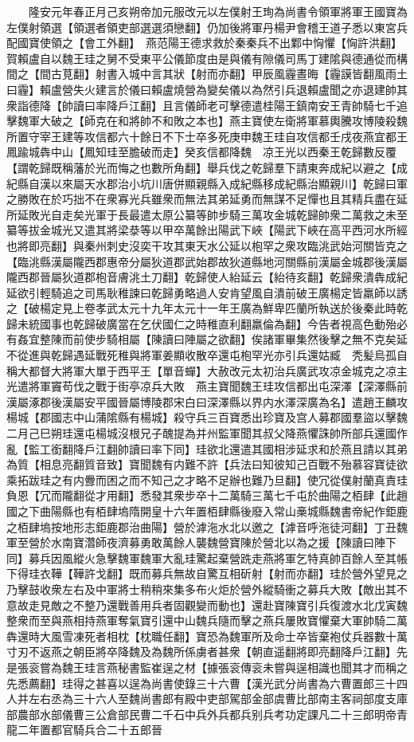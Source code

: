　　隆安元年春正月己亥朔帝加元服改元以左僕射王珣為尚書令領軍將軍王國寶為左僕射領選【領選者領吏部選選須戀翻】仍加後將軍丹楊尹會稽王道子悉以東宮兵配國寶使領之【會工外翻】　燕范陽王德求救於秦秦兵不出鄴中恟懼【恟許洪翻】賀賴盧自以魏王珪之舅不受東平公儀節度由是與儀有隙儀司馬丁建隂與德通從而構間之【間古莧翻】射書入城中言其狀【射而亦翻】甲辰風霾晝晦【霾謨皆翻風雨土曰霾】賴盧營失火建言於儀曰賴盧燒營為變矣儀以為然引兵退賴盧聞之亦退建帥其衆詣德降【帥讀曰率降戶江翻】且言儀師老可擊德遣桂陽王鎮南安王青帥騎七千追擊魏軍大破之【師克在和將帥不和敗之本也】燕主寶使左衛將軍慕輿騰攻博陵殺魏所置守宰王建等攻信都六十餘日不下士卒多死庚申魏王珪自攻信都壬戌夜燕宜都王鳳踰城犇中山【鳳知珪至膽破而走】癸亥信都降魏　凉王光以西秦王乾歸數反覆【謂乾歸既稱藩於光而悔之也數所角翻】舉兵伐之乾歸羣下請東奔成紀以避之【成紀縣自漢以來屬天水郡治小坑川唐併顯親縣入成紀縣移成紀縣治顯親川】乾歸曰軍之勝敗在於巧拙不在衆寡光兵雖衆而無法其弟延勇而無謀不足憚也且其精兵盡在延所延敗光自走矣光軍于長最遣太原公纂等帥步騎三萬攻金城乾歸帥衆二萬救之未至纂等拔金城光又遣其將梁㳟等以甲卒萬餘出陽武下峽【陽武下峽在高平西河水所經也將即亮翻】與秦州刺史沒奕干攻其東天水公延以枹罕之衆攻臨洮武始河關皆克之【臨洮縣漢屬隴西郡惠帝分屬狄道郡武始郡故狄道縣地河關縣前漢屬金城郡後漢屬隴西郡晉屬狄道郡枹音膚洮土刀翻】乾歸使人紿延云【紿待亥翻】乾歸衆潰犇成紀延欲引輕騎追之司馬耿稚諫曰乾歸勇略過人安肯望風自潰前破王廣楊定皆羸師以誘之【破楊定見上卷孝武太元十九年太元十一年王廣為鮮卑匹蘭所執送於後秦此時乾歸未統國事也乾歸破廣當在乞伏國仁之時稚直利翻羸倫為翻】今告者視高色動殆必有姦宜整陳而前使步騎相屬【陳讀曰陣屬之欲翻】俟諸軍畢集然後擊之無不克矣延不從進與乾歸遇延戰死稚與將軍姜顯收散卒還屯枹罕光亦引兵還姑臧　秃髪烏孤自稱大都督大將軍大單于西平王【單音蟬】大赦改元太初治兵廣武攻凉金城克之凉主光遣將軍竇苟伐之戰于街亭凉兵大敗　燕主寶聞魏王珪攻信都出屯深澤【深澤縣前漢屬涿郡後漢屬安平國晉屬博陵郡宋白曰深澤縣以界内水澤深廣為名】遣趙王麟攻楊城【郡國志中山蒲隂縣有楊城】殺守兵三百寶悉出珍寶及宫人募郡國羣盜以擊魏二月己巳朔珪還屯楊城沒根兄子醜提為并州監軍聞其叔父降燕懼誅帥所部兵還國作亂【監工銜翻降戶江翻帥讀曰率下同】珪欲北還遣其國相涉延求和於燕且請以其弟為質【相息亮翻質音致】寶聞魏有内難不許【兵法曰知彼知己百戰不殆慕容寶徒欲乘拓跋珪之有内釁而困之而不知己之才略不足辦也難乃旦翻】使冗從僕射蘭真責珪負恩【冗而隴翻從才用翻】悉發其衆步卒十二萬騎三萬七千屯於曲陽之栢肆【此趙國之下曲陽縣也有栢肆塢隋開皇十六年置栢肆縣後廢入常山槀城縣魏書帝紀作鉅鹿之栢肆塢按地形志鉅鹿郡治曲陽】營於滹沲水北以邀之【滹音呼沲徒河翻】丁丑魏軍至營於水南寶濳師夜濟募勇敢萬餘人襲魏營寶陳於營北以為之援【陳讀曰陣下同】募兵因風縱火急擊魏軍魏軍大亂珪驚起棄營跣走燕將軍乞特真帥百餘人至其帳下得珪衣鞾【鞾許戈翻】既而募兵無故自驚互相斫射【射而亦翻】珪於營外望見之乃擊鼓收衆左右及中軍將士稍稍來集多布火炬於營外縱騎衝之募兵大敗【敵出其不意故走見敵之不整乃還戰善用兵者固觀變而動也】還赴寶陳寶引兵復渡水北戊寅魏整衆而至與燕相持燕軍奪氣寶引還中山魏兵隨而擊之燕兵屢敗寶懼棄大軍帥騎二萬犇還時大風雪凍死者相枕【枕職任翻】寶恐為魏軍所及命士卒皆棄袍仗兵器數十萬寸刃不返燕之朝臣將卒降魏及為魏所係虜者甚衆【朝直遥翻將即亮翻降戶江翻】先是張衮嘗為魏王珪言燕秘書監崔逞之材【據張衮傳衮未嘗與逞相識也聞其才而稱之先悉薦翻】珪得之甚喜以逞為尚書使錄三十六曹【漢光武分尚書為六曹置郎三十四人并左右丞為三十六人至魏尚書郎有殿中吏部駕部金部虞曹比部南主客祠部度支庫部農部水部儀曹三公倉部民曹二千石中兵外兵都兵别兵考功定課凡二十三郎明帝青龍二年置都官騎兵合二十五郎晉